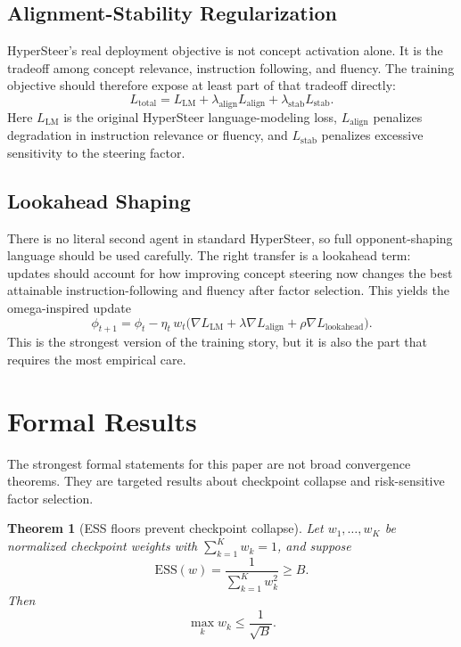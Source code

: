 \documentclass[10pt]{article}
\newtheorem{theorem}{Theorem}
\newcommand{\ESS}{\mathrm{ESS}}
\begin{document}
\subsection{Alignment-Stability Regularization}

HyperSteer’s real deployment objective is not concept activation alone. It is the tradeoff among concept relevance, instruction following, and fluency. The training objective should therefore expose at least part of that tradeoff directly:
\begin{equation}
L_{\mathrm{total}}
=
L_{\mathrm{LM}}
+
\lambda_{\mathrm{align}} L_{\mathrm{align}}
+
\lambda_{\mathrm{stab}} L_{\mathrm{stab}}.
\end{equation}
Here $L_{\mathrm{LM}}$ is the original HyperSteer language-modeling loss, $L_{\mathrm{align}}$ penalizes degradation in instruction relevance or fluency, and $L_{\mathrm{stab}}$ penalizes excessive sensitivity to the steering factor.

\subsection{Lookahead Shaping}

There is no literal second agent in standard HyperSteer, so full opponent-shaping language should be used carefully. The right transfer is a lookahead term: updates should account for how improving concept steering now changes the best attainable instruction-following and fluency after factor selection. This yields the omega-inspired update
\begin{equation}
\phi_{t+1}
=
\phi_t
-
\eta_t \, w_t
\Big(
\nabla L_{\mathrm{LM}}
+
\lambda \nabla L_{\mathrm{align}}
+
\rho \nabla L_{\mathrm{lookahead}}
\Big).
\end{equation}
This is the strongest version of the training story, but it is also the part that requires the most empirical care.

\section{Formal Results}

The strongest formal statements for this paper are not broad convergence theorems. They are targeted results about checkpoint collapse and risk-sensitive factor selection.

\begin{theorem}[ESS floors prevent checkpoint collapse]
Let $w_1,\dots,w_K$ be normalized checkpoint weights with $\sum_{k=1}^K w_k = 1$, and suppose
\begin{equation}
\ESS(w) = \frac{1}{\sum_{k=1}^K w_k^2} \ge B.
\end{equation}
Then
\begin{equation}
\max_k w_k \le \frac{1}{\sqrt{B}}.
\end{equation}
\end{theorem}
\end{document}
